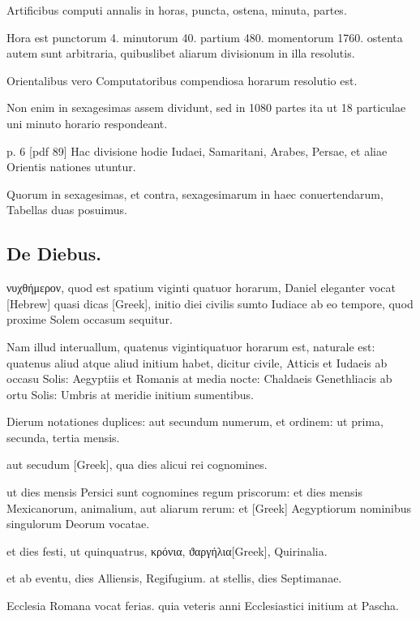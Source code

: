 Artificibus
computi annalis in
horas, puncta, ostena, minuta,
partes.

Hora est punctorum
4. minutorum 40.
partium 480. momentorum
1760. ostenta autem sunt arbitraria,
quibuslibet aliarum
divisionum in illa resolutis.

Orientalibus vero Computatoribus
compendiosa horarum
resolutio est.

Non
enim in sexagesimas assem
dividunt, sed in 1080 partes
ita ut 18 particulae uni minuto
horario respondeant.

p. 6 [pdf 89]
%
Hac divisione hodie Iudaei,
Samaritani, Arabes, Persae,
et aliae Orientis nationes utuntur.

Quorum in sexagesimas, et
contra, sexagesimarum in haec conuertendarum, Tabellas duas posuimus.



\subsection{De Diebus.}
\setcounter{parcount}{0}


\textgreek{νυχθήμερον},
quod est spatium viginti quatuor horarum, Daniel
eleganter vocat \texthebrew{[Hebrew]} quasi dicas
\textgreek{[Greek]}, initio diei civilis
sumto Iudiace ab eo tempore, quod proxime Solem occasum
sequitur.

Nam illud interuallum, quatenus vigintiquatuor horarum est,
naturale est: quatenus aliud atque aliud initium habet, dicitur civile,
Atticis et Iudaeis ab occasu Solis: Aegyptiis et Romanis at media nocte:
Chaldaeis Genethliacis ab ortu Solis: Umbris at meridie initium
sumentibus.

Dierum notationes duplices: aut secundum numerum, et
ordinem: ut prima, secunda, tertia mensis.

aut secudum \textgreek{[Greek]},
qua dies alicui rei cognomines.

ut dies mensis Persici sunt cognomines
regum priscorum: et dies mensis Mexicanorum, animalium, aut aliarum
rerum: et \textgreek{[Greek]} Aegyptiorum nominibus singulorum Deorum
vocatae.

et dies festi, ut quinquatrus, \textgreek{κρόνια},
\textgreek{ϑαργήλια[Greek]}, Quirinalia.

et ab eventu, dies Alliensis, Regifugium. at stellis, dies Septimanae.

Ecclesia Romana vocat ferias. quia veteris anni Ecclesiastici initium
at Pascha.

